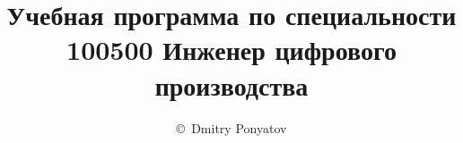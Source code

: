 
\author{\copyright\ Dmitry Ponyatov }
\title{Учебная программа по специальности\\\Huge{100500 Инженер цифрового
производства}}

\maketitle
\tableofcontents




